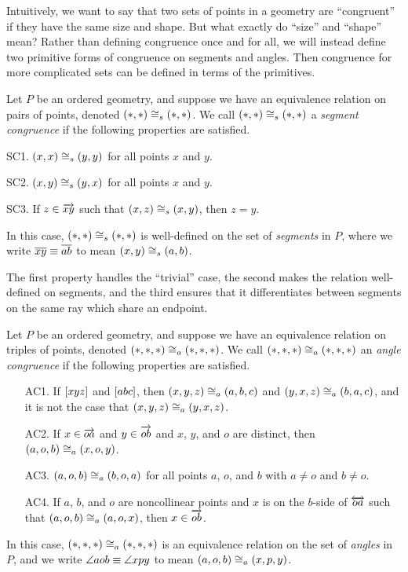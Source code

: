Intuitively, we want to say that two sets of points in a geometry are ``congruent'' if they have the same size and shape.
But what exactly do ``size'' and ``shape'' mean?
Rather than defining congruence once and for all, we will instead define two primitive forms of congruence on segments and angles.
Then congruence for more complicated sets can be defined in terms of the primitives.

\begin{dfn}
Let \(P\) be an ordered geometry, and suppose we have an equivalence relation on pairs of points, denoted \((\ast,\ast) \cong_s (\ast,\ast)\).
We call \((\ast,\ast) \cong_s (\ast,\ast)\) a \emph{segment congruence} if the following properties are satisfied.
\begin{proplist}
\item[SC1.] \((x,x) \cong_s (y,y)\) for all points \(x\) and \(y\).
\item[SC2.] \((x,y) \cong_s (y,x)\) for all points \(x\) and \(y\).
\item[SC3.] If \(z \in \overrightarrow{xy}\) such that \((x,z) \cong_s (x,y)\), then \(z = y\).
\end{proplist}
In this case, \((\ast,\ast) \cong_s (\ast,\ast)\) is well-defined on the set of \emph{segments} in \(P\), where we write \(\overline{xy} \equiv \overline{ab}\) to mean \((x,y) \cong_s (a,b)\).
\end{dfn}

The first property handles the ``trivial'' case, the second makes the relation well-defined on segments, and the third ensures that it differentiates between segments on the same ray which share an endpoint.

\begin{dfn}
Let \(P\) be an ordered geometry, and suppose we have an equivalence relation on triples of points, denoted \((\ast,\ast,\ast) \cong_a (\ast,\ast,\ast)\).
We call \((\ast,\ast,\ast) \cong_a (\ast,\ast,\ast)\) an \emph{angle congruence} if the following properties are satisfied.
\begin{itemize}
\item[AC1.] If \([ x y z ]\) and \([ a b c ]\), then \((x,y,z) \cong_a (a,b,c)\) and \((y,x,z) \cong_a (b,a,c)\), and it is not the case that \((x,y,z) \cong_a (y,x,z)\).
\item[AC2.] If \(x \in \overrightarrow{oa}\) and \(y \in \overrightarrow{ob}\) and \(x\), \(y\), and \(o\) are distinct, then \((a,o,b) \cong_a (x,o,y)\).
\item[AC3.] \((a,o,b) \cong_a (b,o,a)\) for all points \(a\), \(o\), and \(b\) with \(a \neq o\) and \(b \neq o\).
\item[AC4.] If \(a\), \(b\), and \(o\) are noncollinear points and \(x\) is on the \(b\)-side of \(\overleftrightarrow{oa}\) such that \((a,o,b) \cong_a (a,o,x)\), then \(x \in \overrightarrow{ob}\).
\end{itemize}
In this case, \((\ast,\ast,\ast) \cong_a (\ast,\ast,\ast)\) is an equivalence relation on the set of \emph{angles} in \(P\), and we write \(\angle{aob} \equiv \angle{xpy}\) to mean \((a,o,b) \cong_a (x,p,y)\).
\end{dfn}

